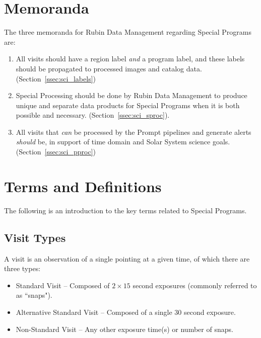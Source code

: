 \section{Memoranda} \label{sec:mem}

The three memoranda for Rubin Data Management regarding Special Programs are:

\begin{enumerate}

\item All visits should have a region label \textit{and} a program 
label, and these labels should be propagated to processed images and catalog data.
(Section~\ref{ssec:sci_labels})

\item Special Processing should be done by Rubin Data Management to 
produce unique and separate data products
for Special Programs when it is both possible and necessary.
(Section~\ref{ssec:sci_sproc}).

\item All visits that \emph{can} be processed by the Prompt pipelines and generate 
alerts \emph{should} be, in support of time domain and Solar System science goals.
(Section~\ref{ssec:sci_pproc})

\end{enumerate}

\section{Terms and Definitions}\label{sec:intro}

The following is an introduction to the key terms related to Special Programs.

\subsection{Visit Types}

A visit is an observation of a single pointing at a given time, of which 
there are three types:

\begin{itemize}
\item Standard Visit -- Composed of $2\times15$ second exposures (commonly referred to as ``snaps").
\item Alternative Standard Visit -- Composed of a single $30$ second exposure.
\item Non-Standard Visit -- Any other exposure time(s) or number of snaps.
\end{itemize}

